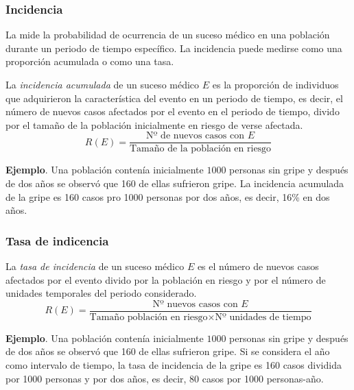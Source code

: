 \begin{frame}
\frametitle{Incidencia}
La  mide la probabilidad de ocurrencia de un suceso médico en una población durante un periodo de tiempo específico.
La incidencia puede medirse como una proporción acumulada o como una tasa.

\begin{definition}
La \emph{incidencia acumulada} de un suceso médico $E$ es la proporción de individuos que adquirieron la característica del evento en un periodo de tiempo, es decir, el número de nuevos casos afectados por el evento en el periodo de tiempo, divido por el tamaño de la población inicialmente en riesgo de verse afectada. 
\[
  R(E)=\frac{\mbox{Nº de nuevos casos con $E$}}{\mbox{Tamaño de la población en riesgo}}
\]
\end{definition}

\textbf{Ejemplo}. Una población contenía inicialmente $1000$ personas sin gripe y después de dos años se observó que 160 de ellas sufrieron gripe.
La incidencia acumulada de la gripe es 160 casos pro 1000 personas por dos años, es decir, 16\% en dos años.
\end{frame}
  

\begin{frame}
\frametitle{Tasa de indicencia}
  
\begin{definition}
La \emph{tasa de incidencia} de un suceso médico $E$ es el número de nuevos casos afectados por el evento divido por la población en riesgo y por el número de unidades temporales del periodo considerado.
\[
  R(E)=\frac{\mbox{Nº nuevos casos con $E$}}{\mbox{Tamaño población en riesgo}\times \mbox{Nº unidades de tiempo}}
\]
\end{definition}

\textbf{Ejemplo}. Una población contenía inicialmente $1000$ personas sin gripe y después de dos años se observó que 160 de ellas sufrieron gripe.
Si se considera el año como intervalo de tiempo, la tasa de incidencia de la gripe es 160 casos dividida por 1000 personas y por dos años, es decir, 80 casos por 1000 personas-año.
\end{frame}


